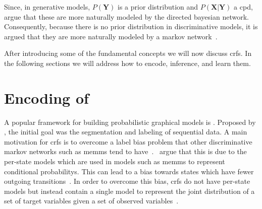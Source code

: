 Since, in \glspl{generative model}, $P(\mathbf{Y})$ is a \gls{prior distribution} and $P(\mathbf{X}|\mathbf{Y})$ a \gls{cpd}, \citet{sutton2010introduction} argue that these are more naturally modeled by the directed \gls{bayesian network}.
Consequently, because there is no \gls{prior distribution} in \glspl{discriminative model}, it is argued that they are more naturally modeled by a \gls{markov network}~\citep{sutton2010introduction}.

\bigskip

After introducing some of the fundamental concepts we will now discuss \glspl{crf}. In the following sections we will address how to encode, inference, and learn them.

\section{Encoding of }\label{sec:definition-crfs}
A popular framework for building \glspl{probabilistic graphical model} is .
Proposed by \citet{lafferty2001conditional}, the initial goal was the segmentation and labeling of sequential data.
A main motivation for \glspl{crf} is to overcome a label bias problem that other discriminative \glspl{markov network} such as \glspl{memm} tend to have~\citep{lafferty2001conditional}.\
\citet{lafferty2001conditional} argue that this is due to the per-state models which are used in models such as \glspl{memm} to represent \glspl{conditional probability}.
This can lead to a bias towards states which have fewer outgoing transitions~\citep{lafferty2001conditional}.
In order to overcome this bias, \glspl{crf} do not have per-state models but instead contain a single model to represent the \gls{joint distribution} of a set of \glspl{target variable} given a set of \glspl{observed variable}~\citep{lafferty2001conditional}.

\bigskip

